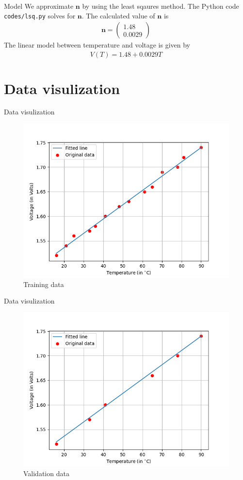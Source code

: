 \documentclass{beamer}
\theoremstyle{remark}
\newcommand{\myvec}[1]{\ensuremath{\begin{pmatrix}#1\end{pmatrix}}}
\renewcommand{\vec}[1]{\mathbf{\boldsymbol{#1}}}
\begin{document}
\begin{frame}{Model}
    We approximate $\vec{n}$ by using the least sqaures method. The Python code
    \texttt{codes/lsq.py} solves for $\vec{n}$.
    The calculated value of $\vec{n}$ is
    \begin{align}
        \vec{n} = \myvec{1.48 \\ 0.0029}
    \end{align}
    The linear model between temperature and voltage is given by
    \begin{align}
        V(T) = 1.48 + 0.0029T
    \end{align}
\end{frame}

\section{Data visulization}
\begin{frame}{Data visulization}
    \begin{figure}[!ht]
        \centering
        \includegraphics[width=0.6\columnwidth]{figs/train.png}
        \caption{Training data}
        \label{fig:Training data}
    \end{figure}
\end{frame}

\begin{frame}{Data visulization}
    \begin{figure}[!ht]
        \centering
        \includegraphics[width=0.6\columnwidth]{figs/test.png}
        \caption{Validation data}
        \label{fig:Validation data}
    \end{figure}

\end{frame}
\end{document}
